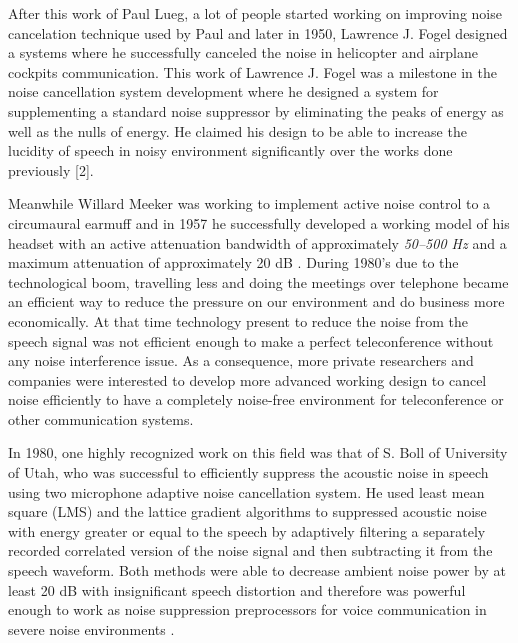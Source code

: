 \documentclass[11pt,a4paper,english]{book}  %
\theoremstyle{definition}  %
\theoremstyle{plain}  %
\theoremstyle{remark}  %
\begin{document}
After this work of Paul Lueg, a lot of people started working on improving noise cancelation technique used by Paul and later in 1950, Lawrence J. Fogel designed a systems where he successfully canceled the noise in helicopter and airplane cockpits communication. This work of Lawrence J. Fogel was a milestone in the noise cancellation system development where he designed a system for supplementing a standard noise suppressor by eliminating the peaks of energy as well as the nulls of energy. He claimed his design to be able to increase the lucidity of speech in noisy environment significantly over the works done previously [2].

Meanwhile Willard Meeker was working to implement active noise control to a circumaural earmuff and in 1957 he successfully developed a working model of his headset with an active attenuation bandwidth of approximately \textit{50–500 Hz} and a maximum attenuation of approximately 20 dB \cite{online3}.
During 1980’s due to the technological boom, travelling less and doing the meetings over telephone became an efficient way to reduce the pressure on our environment and do business more economically. At that time technology present to reduce the noise from the speech signal was not efficient enough to make a perfect teleconference without any noise interference issue. As a consequence, more private researchers and companies were interested to develop more advanced working design to cancel noise efficiently to have a completely noise-free environment for teleconference or other communication systems. 

In 1980, one highly recognized work on this field was that of S. Boll of University of Utah, who was successful to efficiently suppress the acoustic noise in speech using two microphone adaptive noise cancellation system. He used least mean square (LMS) and the lattice gradient algorithms to suppressed acoustic noise with energy greater or equal to the speech by adaptively filtering a separately recorded correlated version of the noise signal and then subtracting it from the speech waveform. Both methods were able to decrease ambient noise power by at least 20 dB with insignificant speech distortion and therefore was powerful enough to work as noise suppression preprocessors for voice communication in severe noise environments \cite{supression}.
\end{document}
